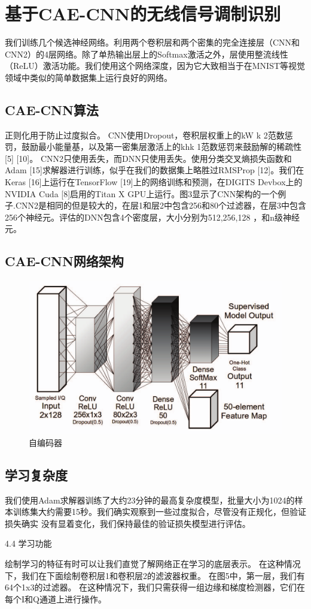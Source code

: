 \section{基于CAE-CNN的无线信号调制识别}
我们训练几个候选神经网络。利用两个卷积层和两个密集的完全连接层（CNN和CNN2）的4层网络。除了单热输出层上的Softmax激活之外，层使用整流线性（ReLU）激活功能。我们使用这个网络深度，因为它大致相当于在MNIST等视觉领域中类似的简单数据集上运行良好的网络。\par 

\subsection{CAE-CNN算法}
正则化用于防止过度拟合。 CNN使用Dropout，卷积层权重上的kW k 2范数惩罚，鼓励最小能量基，以及第一密集层激活上的khk 1范数惩罚来鼓励解的稀疏性[5] [10]。 CNN2只使用丢失，而DNN只使用丢失。使用分类交叉熵损失函数和Adam [15]求解器进行训练，似乎在我们的数据集上略胜过RMSProp [12]。我们在Keras [16]上运行在TensorFlow [19]上的网络训练和预测，在DIGITS Devbox上的NVIDIA Cuda [8]启用的Titan X GPU上运行。图3显示了CNN架构的一个例子.CNN2是相同的但是较大的，在层1和层2中包含256和80个过滤器，在层3中包含256个神经元。评估的DNN包含4个密度层，大小分别为512,256,128 ，和n级神经元。\par

\subsection{CAE-CNN网络架构}
\begin{figure}[!h]
	\centering
	\includegraphics[scale=0.3]{figures/chapter_3/cae_cnn_frame}
	\caption{自编码器}	\label{fig_3_2}
\end{figure}

\subsection{学习复杂度}
我们使用Adam求解器训练了大约23分钟的最高复杂度模型，批量大小为1024的样本训练集大约需要15秒。我们确实观察到一些过度拟合，尽管没有正规化，但验证损失确实 没有显着变化，我们保持最佳的验证损失模型进行评估。\par
4.4 学习功能 \par
绘制学习的特征有时可以让我们直觉了解网络正在学习的底层表示。 在这种情况下，我们在下面绘制卷积层1和卷积层2的滤波器权重。 在图5中，第一层，我们有64个1x3的过滤器。 在这种情况下，我们只需获得一组边缘和梯度检测器，它们在每个I和Q通道上进行操作。\par

